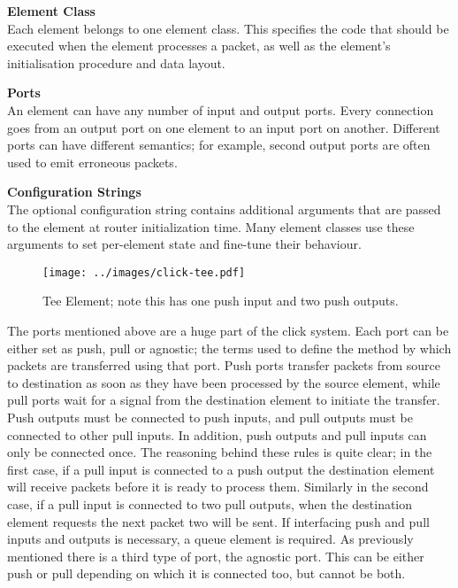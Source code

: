     \begin{enumerate*}
    \item\textbf{Element Class}\hfill\\Each element belongs to one element class. This specifies the code that should be executed when the element processes a packet, as well as the element’s initialisation procedure and data layout.
    \item\textbf{Ports}\hfill\\An element can have any number of input and output ports. Every connection goes from an output port on one element to an input port on another. Different ports can have different semantics; for example, second output ports are often used to emit erroneous packets.
    \item\textbf{Configuration Strings}\hfill\\The optional configuration string contains additional arguments that are passed to the element at router initialization time. Many element classes use these arguments to set per-element state and fine-tune their behaviour.
    \end{enumerate*}

    \begin{figure}[ht!]
    \centering
    \texttt{[image: ../images/click-tee.pdf]}
    \caption{Tee Element; note this has one push input and two push outputs.\cite{EKRM+00}}
    \label{fig:click-tee}
    \end{figure}
    \label{sec:click-ports}
    The ports mentioned above are a huge part of the click system. Each port can be either set as push, pull or agnostic; the terms used to define the method by which packets are transferred using that port. Push ports transfer packets from source to destination as soon as they have been processed by the source element, while pull ports wait for a signal from the destination element to initiate the transfer. Push outputs must be connected to push inputs, and pull outputs must be connected to other pull inputs. In addition, push outputs and pull inputs can only be connected once. The reasoning behind these rules is quite clear; in the first case, if a pull input is connected to a push output the destination element will receive packets before it is ready to process them. Similarly in the second case, if a pull input is connected to two pull outputs, when the destination element requests the next packet two will be sent. If interfacing push and pull inputs and outputs is necessary, a queue element is required. As previously mentioned there is a third type of port, the agnostic port. This can be either push or pull depending on which it is connected too, but cannot be both.

